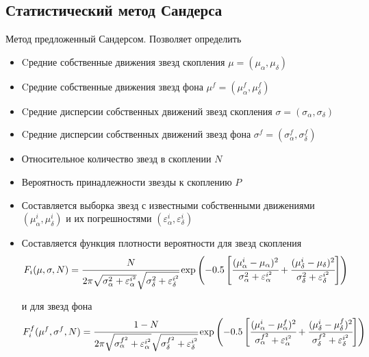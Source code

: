 \documentclass{beamer}
\begin{document}
    \subsection{Статистический метод Сандерса}
    \begin{frame}
        Метод предложенный Сандерсом\cite{Sanders}. Позволяет определить
        \begin{itemize}
            \item Cредние собственные движения звезд скопления $\mu = (\mu_\alpha, \mu_\delta)$
            \item Cредние собственные движения звезд фона $\mu^f = (\mu^f_\alpha, \mu^f_\delta)$
            \item Cредние дисперсии собственных движений звезд скопления $\sigma = (\sigma_\alpha, \sigma_\delta)$
            \item Cредние дисперсии собственных движений звезд фона $\sigma^f = (\sigma^f_\alpha, \sigma^f_\delta)$
            \item Относительное количество звезд в скоплении $N$
            \item Вероятность принадлежности звезды к скоплению $P$
        \end{itemize}
    \end{frame}
    \begin{frame}
        \begin{itemize}
            \item Составляется выборка звезд с известными собственными движениями $(\mu^i_\alpha, \mu^i_\delta)$ и их погрешностями $(\varepsilon^i_\alpha, \varepsilon^i_\delta)$
            \item Составляется функция плотности вероятности для звезд скопления
            \scriptsize
            \begin{equation*}
                    F_i(\mu, \sigma, N) = \cfrac{N}{2\pi\sqrt{\sigma^{2}_\alpha + \varepsilon_\alpha^{i^2}}\sqrt{\sigma^{2}_\delta + \varepsilon_\delta^{i^2}}}\exp\left(-0.5\left[ \cfrac{(\mu^i_\alpha - \mu_\alpha)^2}{\sigma^{2}_\alpha + \varepsilon_\alpha^{i^2}} + \cfrac{(\mu^i_\delta - \mu_\delta)^2}{\sigma^{2}_\delta + \varepsilon_\delta^{i^2}} \right]\right)
            \end{equation*}

            \normalsize и для звезд фона
            \scriptsize
            \begin{equation*}
                    F^f_i(\mu^f, \sigma^f, N) = \cfrac{1-N}{2\pi\sqrt{\sigma^{f^2}_\alpha + \varepsilon_\alpha^{i^2}}\sqrt{\sigma^{f^2}_\delta + \varepsilon_\delta^{i^2}}}\exp\left(-0.5\left[ \cfrac{(\mu^i_\alpha - \mu^f_\alpha)^2}{\sigma^{f^2}_\alpha + \varepsilon_\alpha^{i^2}} + \cfrac{(\mu^i_\delta - \mu^f_\delta)^2}{\sigma^{f^2}_\delta + \varepsilon_\delta^{i^2}} \right]\right)
            \end{equation*}
        \end{itemize}
    \end{frame}
\end{document}
